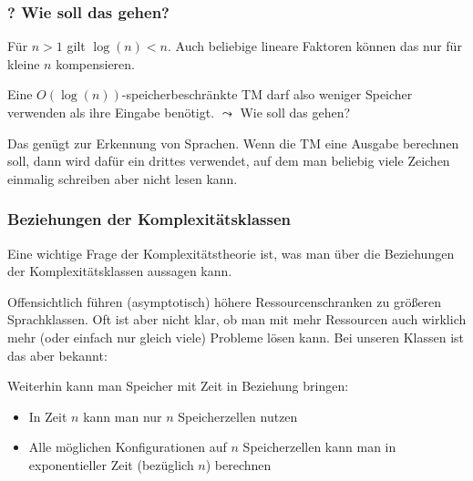 \documentclass[onlymath]{beamer}
\begin{document}
\begin{frame}\frametitle{? Wie soll das gehen?}

Für $n>1$ gilt \alert{$\log(n)<n$}. Auch beliebige lineare Faktoren können das nur für kleine $n$ kompensieren.\\
\medskip

Eine $O(\log(n))$-speicherbeschränkte TM darf also weniger Speicher verwenden als ihre Eingabe benötigt.
\alert{$\leadsto$ Wie soll das gehen?}
\bigskip\pause


{\footnotesize
Das genügt zur Erkennung von Sprachen. Wenn die TM eine Ausgabe berechnen soll, dann wird dafür ein 
drittes  verwendet, auf dem man beliebig viele Zeichen einmalig schreiben aber nicht lesen kann.\\
}

\end{frame}

\begin{frame}\frametitle{Beziehungen der Komplexitätsklassen}

\alert{Eine wichtige Frage der Komplexitätstheorie ist, was man über die Beziehungen der
Komplexitätsklassen aussagen kann.}
\medskip\pause

Offensichtlich führen (asymptotisch) höhere Ressourcenschranken zu größeren Sprachklassen.
Oft ist aber nicht klar, ob man mit mehr Ressourcen auch wirklich mehr (oder einfach nur gleich viele) Probleme lösen kann. Bei
unseren Klassen ist das aber bekannt:\medskip

\medskip\pause

Weiterhin kann man Speicher mit Zeit in Beziehung bringen:
\begin{itemize}
\item In Zeit $n$ kann man nur $n$ Speicherzellen nutzen
\item Alle möglichen Konfigurationen auf $n$ Speicherzellen kann man in exponentieller Zeit (bezüglich $n$) berechnen
\end{itemize}


\end{frame}
\end{document}
